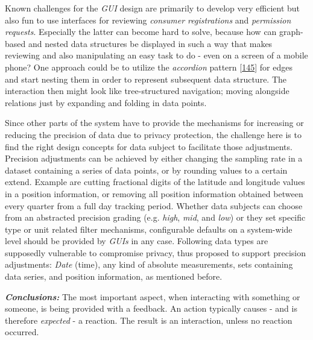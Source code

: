 \documentclass[12pt,english,a4paper,titlepage,cleardoublepage=empty,dottedtoc]{report}
\begin{document}
Known challenges for the \emph{GUI} design are primarily to develop very
efficient but also fun to use interfaces for reviewing \emph{consumer
registrations} and \emph{permission requests}. Especially the latter can
become hard to solve, because how can graph-based and nested data
structures be displayed in such a way that makes reviewing and also
manipulating an easy task to do - even on a screen of a mobile phone?
One approach could be to utilize the \emph{accordion} pattern
{[}\protect\hyperlink{ref-web_2016_wikipedia_accordion-gui}{145}{]} for
edges and start nesting them in order to represent subsequent data
structure. The interaction then might look like tree-structured
navigation; moving alongside relations just by expanding and folding in
data points.

Since other parts of the system have to provide the mechanisms for
increasing or reducing the precision of data due to privacy protection,
the challenge here is to find the right design concepts for data subject
to facilitate those adjustments. Precision adjustments can be achieved
by either changing the sampling rate in a dataset containing a series of
data points, or by rounding values to a certain extend. Example are
cutting fractional digits of the latitude and longitude values in a
position information, or removing all position information obtained
between every quarter from a full day tracking period. Whether data
subjects can choose from an abstracted precision grading (e.g.
\emph{high}, \emph{mid}, and \emph{low}) or they set specific type or
unit related filter mechanisms, configurable defaults on a system-wide
level should be provided by \emph{GUIs} in any case. Following data
types are supposedly vulnerable to compromise privacy, thus proposed to
support precision adjustments: \emph{Date} (time), any kind of absolute
measurements, sets containing data series, and position information, as
mentioned before.

\emph{\textbf{Conclusions:}} The most important aspect, when interacting
with something or someone, is being provided with a feedback. An action
typically causes - and is therefore \emph{expected} - a reaction. The
result is an interaction, unless no reaction occurred.
\end{document}

